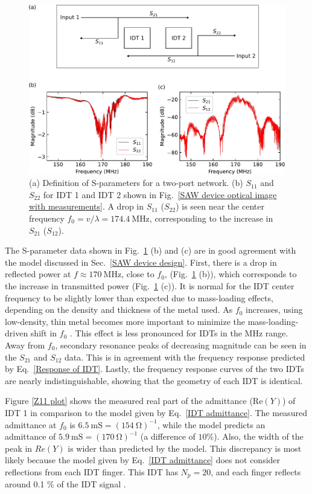 \documentclass[double,12pt,1in,seploa]{beavtex}
\begin{document}
\begin{figure}
    \includegraphics[width = 1\textwidth]{S-parameters.pdf}
    \caption{(a) Definition of S-parameters for a two-port network. (b) $S_{11}$ and $S_{22}$ for IDT 1 and IDT 2 shown in Fig.\ \ref{SAW device optical image with measurements}. A drop in $S_{11}$ ($S_{22}$) is seen near the center frequency $f_0 = v/\lambda = \SI{174.4}{\mega\hertz}$, corresponding to the increase in $S_{21}$ ($S_{12}$).}
    \label{S-parameters}
\end{figure}
The S-parameter data shown in Fig.\ \ref{S-parameters} (b) and (c) are in good agreement with the model discussed in Sec.\ \ref{SAW device design}. First, there is a drop in reflected power at $f \approx \SI{170}{\mega\hertz}$, close to $f_0$, (Fig.\ \ref{S-parameters} (b)), which corresponds to the increase in transmitted power (Fig.\ \ref{S-parameters} (c)). It is normal for the IDT center frequency to be slightly lower than expected due to mass-loading effects, depending on the density and thickness of the metal used. As $f_0$ increases, using low-density, thin metal becomes more important to minimize the mass-loading-driven shift in $f_0$ \cite{chen_ultrahigh-frequency_2020}. This effect is less pronounced for IDTs in the MHz range. Away from $f_0$, secondary resonance peaks of decreasing magnitude can be seen in the $S_{21}$ and $S_{12}$ data. This is in agreement with the frequency response predicted by Eq.\ \ref{Response of IDT}. Lastly, the frequency response curves of the two IDTs are nearly indistinguishable, showing that the geometry of each IDT is identical. 

Figure \ref{Z11 plot} shows the measured real part of the admittance ($\mathrm{Re}(Y)$) of IDT 1 in comparison to the model given by Eq.\ \ref{IDT admittance}. The measured admittance at $f_0$ is $\SI{6.5}{\milli\siemens} = (\SI{154}{\ohm})^{-1}$, while the model predicts an admittance of $\SI{5.9}{\milli\siemens} = (\SI{170}{\ohm})^{-1}$ (a difference of $10\%$). Also, the width of the peak in $Re(Y)$ is wider than predicted by the model. This discrepancy is most likely because the model given by Eq.\ \ref{IDT admittance} does not consider reflections from each IDT finger. This IDT has $N_p = 20$, and each finger reflects around 0.1  \% of the IDT signal \cite[p.140]{lane_integrating_2021}.
\end{document}
